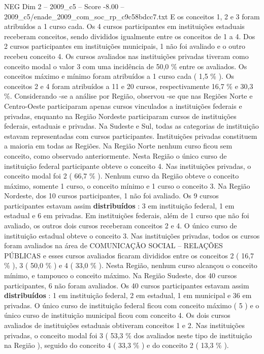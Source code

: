 \begin{textsample}{NEG Dim 2 – 2009\_c5 – Score -8.00 – 2009\_c5/enade\_2009\_com\_soc\_rp\_c9c58bdcc7.txt}
E os conceitos 1, 2 e 3 foram atribuídos a 1 curso cada.
Os 4 cursos participantes em instituições estaduais receberam conceitos, sendo divididos igualmente entre os conceitos de 1 a 4.
Dos 2 cursos participantes em instituições municipais, 1 não foi avaliado e o outro recebeu conceito 4.
Os cursos avaliados nas instituições privadas tiveram como conceito modal o valor 3 com uma incidência de 50,0 \% entre os avaliados.
Os conceitos máximo e mínimo foram atribuídos a 1 curso cada ( 1,5 \% ).
Os conceitos 2 e 4 foram atribuídos a 11 e 20 cursos, respectivamente 16,7 \% e 30,3 \%.
Considerando -se a análise por Região, observou -se que nas Regiões Norte e Centro-Oeste participaram apenas cursos vinculados a instituições federais e privadas, enquanto na Região Nordeste participaram cursos de instituições federais, estaduais e privadas.
Na Sudeste e Sul, todas as categorias de instituição estavam representadas com cursos participantes.
Instituições privadas constituem a maioria em todas as Regiões.
Na Região Norte nenhum curso ficou sem conceito, como observado anteriormente.
Nesta Região o único curso de instituição federal participante obteve o conceito 4.
Nas instituições privadas, o conceito modal foi 2 ( 66,7 \% ).
Nenhum curso da Região obteve o conceito máximo, somente 1 curso, o conceito mínimo e 1 curso o conceito 3.
Na Região Nordeste, dos 10 cursos participantes, 1 não foi avaliado.
Os 9 cursos participantes estavam assim \textbf{distribuídos} : 3 em instituição federal, 1 em estadual e 6 em privadas.
Em instituições federais, além de 1 curso que não foi avaliado, os outros dois cursos receberam conceitos 2 e 4.
O único curso de instituição estadual obteve o conceito 3.
Nas instituições privadas, todos os cursos foram avaliados na área de COMUNICAÇÃO SOCIAL – RELAÇÕES PÚBLICAS e esses cursos avaliados ficaram divididos entre os conceitos 2 ( 16,7 \% ), 3 ( 50,0 \% ) e 4 ( 33,0 \% ).
Nesta Região, nenhum curso alcançou o conceito mínimo, e tampouco o conceito máximo.
Na Região Sudeste, dos 40 cursos participantes, 6 não foram avaliados.
Os 40 cursos participantes estavam assim \textbf{distribuídos} : 1 em instituição federal, 2 em estadual, 1 em municipal e 36 em privadas.
O único curso de instituição federal ficou com conceito máximo ( 5 ) e o único curso de instituição municipal ficou com conceito 4.
Os dois cursos avaliados de instituições estaduais obtiveram conceitos 1 e 2.
Nas instituições privadas, o conceito modal foi 3 ( 53,3 \% dos avaliados neste tipo de instituição na Região ), seguido do conceito 4 ( 33,3 \% ) e do conceito 2 ( 13,3 \% ).

\end{textsample}
